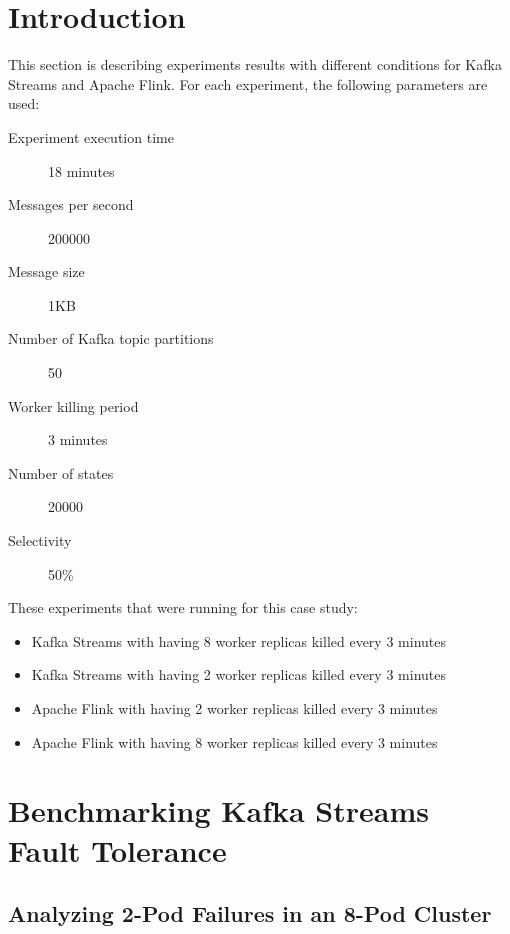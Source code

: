 \section{Introduction}\label{sec:introduction-results}
This section is describing experiments results with different conditions
for Kafka Streams and Apache Flink.
For each experiment, the following parameters are used:

\begin{description}
    \item[Experiment execution time] 18 minutes
    \item[Messages per second] 200000
    \item[Message size] 1KB
    \item[Number of Kafka topic partitions] 50
    \item[Worker killing period] 3 minutes
    \item[Number of states] 20000
    \item[Selectivity] 50\%
\end{description}


These experiments that were running for this case study:

\begin{itemize}
    \item Kafka Streams with having 8 worker replicas killed every 3 minutes
    \item Kafka Streams with having 2 worker replicas killed every 3 minutes
    \item Apache Flink with having 2 worker replicas killed every 3 minutes
    \item Apache Flink with having 8 worker replicas killed every 3 minutes
\end{itemize}


\newpage
\section{Benchmarking Kafka Streams Fault Tolerance}\label{sec:benchmarking-kafka-streams-fault-tolerance}

\subsection{Analyzing 2-Pod Failures in an 8-Pod Cluster}\label{subsec:analyzing-2-pod-failures-in-an-8-pod-cluster}


